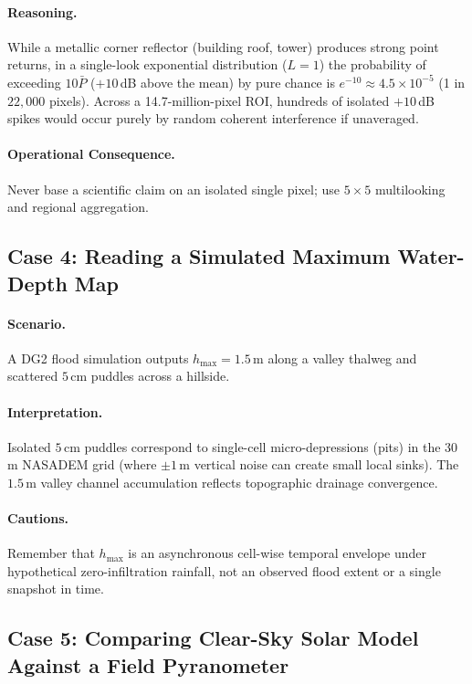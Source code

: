 \documentclass[11pt,a4paper]{article}
\begin{document}
\paragraph{Reasoning.} While a metallic corner reflector (building roof, tower) produces strong point returns, in a single-look exponential distribution ($L=1$) the probability of exceeding $10\bar{P}$ ($+10$\,dB above the mean) by pure chance is $e^{-10}\approx 4.5\times10^{-5}$ (1 in $22,000$ pixels). Across a 14.7-million-pixel ROI, hundreds of isolated $+10$\,dB spikes would occur purely by random coherent interference if unaveraged.

\paragraph{Operational Consequence.} Never base a scientific claim on an isolated single pixel; use $5\times5$ multilooking and regional aggregation.

\subsection{Case 4: Reading a Simulated Maximum Water-Depth Map}

\paragraph{Scenario.} A DG2 flood simulation outputs $h_{\max}=1.5$\,m along a valley thalweg and scattered $5$\,cm puddles across a hillside.

\paragraph{Interpretation.} Isolated $5$\,cm puddles correspond to single-cell micro-depressions (pits) in the 30\,m NASADEM grid (where $\pm 1$\,m vertical noise can create small local sinks). The $1.5$\,m valley channel accumulation reflects topographic drainage convergence.

\paragraph{Cautions.} Remember that $h_{\max}$ is an asynchronous cell-wise temporal envelope under hypothetical zero-infiltration rainfall, not an observed flood extent or a single snapshot in time.

\subsection{Case 5: Comparing Clear-Sky Solar Model Against a Field Pyranometer}
\end{document}
